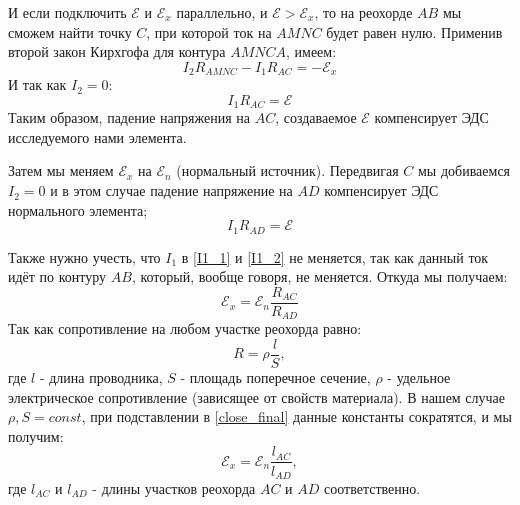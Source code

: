\documentclass[a4paper,12pt]{article}
\begin{document}
И если подключить $\mathcal{E}$ и  $\mathcal{E}_x$ параллельно, и $\mathcal{E} > \mathcal{E}_x$, то на реохорде $AB$ мы сможем найти точку $C$, при которой ток на $AMNC$ будет равен нулю. 
Применив второй закон Кирхгофа для контура $AMNCA$, имеем:
\begin{equation}\label{Kirchhoff}
	I_2R_{AMNC} - I_1R_{AC} = -\mathcal{E}_x
\end{equation}
И так как $I_2 = 0$:
\begin{equation}\label{I1_1}
	I_1R_{AC} = \mathcal{E}
\end{equation}
Таким образом, падение напряжения на $AC$, создаваемое $\mathcal{E}$ компенсирует ЭДС исследуемого нами элемента.

Затем мы меняем $\mathcal{E}_x$ на $\mathcal{E}_n$ (нормальный источник). Передвигая $C$ мы добиваемся $I_2 = 0$ и в этом случае падение напряжение на $AD$ компенсирует ЭДС нормального элемента;
\begin{equation}\label{I1_2}
	I_1R_{AD} = \mathcal{E}
\end{equation}

Также нужно учесть, что $I_1$ в \eqref{I1_1} и \eqref{I1_2} не меняется, так как данный ток идёт по контуру $AB$, который, вообще говоря, не меняется. Откуда мы получаем:
\begin{equation}\label{close_final}
	\mathcal{E}_x = \mathcal{E}_n\frac{R_{AC}}{R_{AD}} 
\end{equation}
Так как сопротивление на любом участке реохорда равно:
$$ R = \rho \frac{l}{S},$$
где $l$ - длина проводника, $S$ - площадь поперечное сечение, $\rho$ - удельное электрическое сопротивление (зависящее от свойств материала).
В нашем случае $\rho, S = const$, при подставлении в \eqref{close_final} данные константы сократятся, и мы получим:
\begin{equation}\label{rab_form}
	\mathcal{E}_x = \mathcal{E}_n\frac{l_{AC}}{l_{AD}},
\end{equation}
где $l_{AC}$ и $l_{AD}$ - длины участков реохорда $AC$ и $AD$ соответственно.

\newpage
\end{document}
